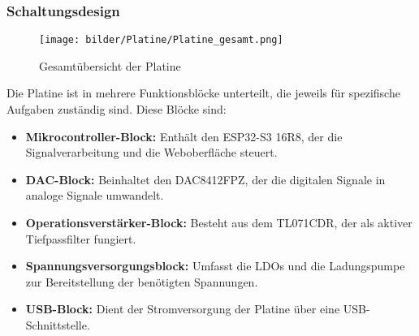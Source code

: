 \subsubsection{Schaltungsdesign}
\begin{figure}[H]
    \centering
    \texttt{[image: bilder/Platine/Platine\_gesamt.png]}
    \caption{Gesamtübersicht der Platine}
    \label{fig:gesamtuebersicht}
\end{figure}
Die Platine ist in mehrere Funktionsblöcke unterteilt, die jeweils für spezifische Aufgaben zuständig sind. Diese Blöcke sind:
\begin{itemize}
    \item \textbf{Mikrocontroller-Block:} Enthält den ESP32-S3 16R8, der die Signalverarbeitung und die Weboberfläche steuert.
    \item \textbf{DAC-Block:} Beinhaltet den DAC8412FPZ, der die digitalen Signale in analoge Signale umwandelt.
    \item \textbf{Operationsverstärker-Block:} Besteht aus dem TL071CDR, der als aktiver Tiefpassfilter fungiert.
    \item \textbf{Spannungsversorgungsblock:} Umfasst die LDOs und die Ladungspumpe zur Bereitstellung der benötigten Spannungen.
    \item \textbf{USB-Block:} Dient der Stromversorgung der Platine über eine USB-Schnittstelle.
\end{itemize}


